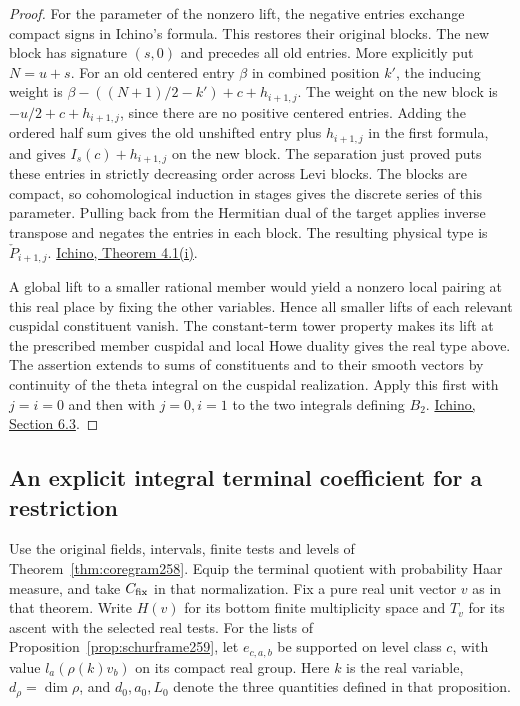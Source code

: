 \documentclass[a4paper,11pt]{article}
\theoremstyle{definition}
\theoremstyle{remark}
\numberwithin{equation}{section}
\begin{document}
\begin{proof}
For the parameter of the nonzero lift, the negative entries
exchange compact signs in Ichino's formula. This restores their
original blocks. The new block has signature \((s,0)\) and
precedes all old entries. More explicitly put \(N=u+s\).
For an old centered entry \(\beta\) in combined position \(k'\),
the inducing weight is
\(\beta-((N+1)/2-k')+c+h_{i+1,j}\). The weight on the new block
is \(-u/2+c+h_{i+1,j}\), since there are no positive centered
entries. Adding the ordered half sum gives the old unshifted
entry plus \(h_{i+1,j}\) in the first formula, and gives
\(I_s(c)+h_{i+1,j}\) on the new block. The separation just
proved puts these entries in strictly decreasing order across
Levi blocks. The blocks are compact, so cohomological induction
in stages gives the discrete series of this parameter. Pulling
back from the Hermitian dual of the target applies inverse
transpose and negates the entries in each block. The resulting
physical type is \(\check P_{i+1,j}\).
\href{https://arxiv.org/pdf/2002.09148}{Ichino, Theorem 4.1(i)}.

A global lift to a smaller rational member would yield a
nonzero local pairing at this real place by fixing the
other variables. Hence all smaller lifts of each relevant
cuspidal constituent vanish. The constant-term tower property
makes its lift at the prescribed member cuspidal and local
Howe duality gives the real type above. The assertion extends
to sums of constituents and to their smooth vectors by
continuity of the theta integral on the cuspidal realization.
Apply this first with \(j=i=0\) and then with \(j=0,i=1\)
to the two integrals defining \(B_2\).
\href{https://arxiv.org/pdf/2002.09148}{Ichino, Section 6.3}.
\end{proof}

\subsection{An explicit integral terminal coefficient for a restriction}\label{nav:V-37}
Use the original fields, intervals, finite tests and levels of
Theorem~\ref{thm:coregram258}. Equip the terminal quotient with
probability Haar measure, and take \(C_{\rm fix}\) in that
normalization. Fix a pure real unit vector \(v\) as in that
theorem. Write \(H(v)\) for its bottom finite multiplicity
space and \(T_v\) for its ascent with the selected real tests.
For the lists of Proposition~\ref{prop:schurframe259}, let
\(e_{c,a,b}\) be supported on level class \(c\), with value
\(l_a(\rho(k)v_b)\) on its compact real group. Here \(k\) is
the real variable, \(d_\rho=\dim\rho\), and \(d_0,a_0,L_0\)
denote the three quantities defined in that proposition.
\end{document}
